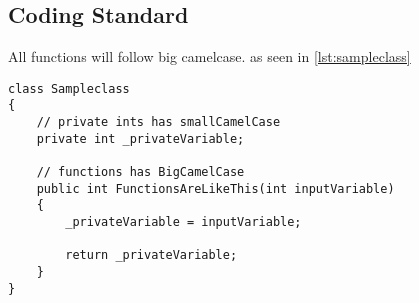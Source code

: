 \subsection{Coding Standard}
\label{subsec:coding_standard}

All functions will follow big camelcase. as seen in \ref{lst:sampleclass}

\begin{lstlisting}[style=sourceCode, caption=\myCaption{Sampleclass.cs}, label=lst:sampleclass]
class Sampleclass
{
    // private ints has smallCamelCase
    private int _privateVariable;

    // functions has BigCamelCase
    public int FunctionsAreLikeThis(int inputVariable)
    {
        _privateVariable = inputVariable;

        return _privateVariable;
    }
}
\end{lstlisting}